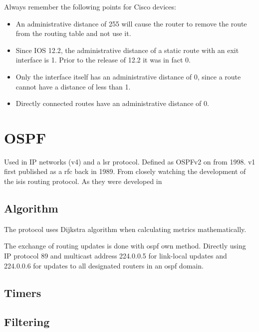 Always remember the following points for Cisco devices:\cite{wiki:Administrative_distance}
\begin{itemize}
    \item An administrative distance of 255 will cause the router to remove the route from the routing table and not use it.
    \item Since IOS 12.2, the administrative distance of a static route with an exit interface is 1. Prior to the release of 12.2 it was in fact 0.
    \item Only the interface itself has an administrative distance of 0, since a route cannot have a distance of less than 1.
    \item Directly connected routes have an administrative distance of 0.
\end{itemize}

\newpage

\section{OSPF}

Used in IP networks (v4) and a \gls{lsr} protocol. Defined as OSPFv2 on 
from 1998. v1 first published as a \gls{rfc} back in 1989. From closely watching
the development of the \gls{isis} routing protocol. As they were developed in

\cite{Theendle83:online}

\subsection{Algorithm}

The protocol uses Dijkstra algorithm when calculating metrics mathematically.

The exchange of routing updates is done with \gls{ospf} own method. Directly
using IP protocol 89 and multicast address 224.0.0.5 for link-local updates and
224.0.0.6 for updates to all designated routers in an \gls{ospf} domain.

\subsection{Timers}

\subsection{Filtering}

